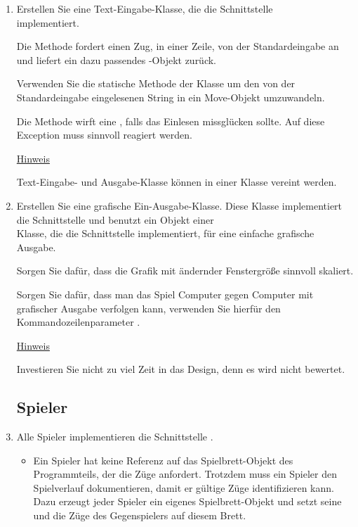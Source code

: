 \begin{enumerate}
\item Erstellen Sie eine Text-Eingabe-Klasse, die die Schnittstelle \\  implementiert.

Die Methode  fordert einen Zug, in einer Zeile, von der Standardeingabe an und liefert ein dazu passendes -Objekt zurück.

Verwenden Sie die statische Methode  der Klasse  um den von der Standardeingabe eingelesenen String in ein Move-Objekt umzuwandeln.

Die Methode  wirft eine , falls das Einlesen missglücken sollte. Auf diese Exception muss sinnvoll reagiert werden.

\underline{Hinweis}

Text-Eingabe- und Ausgabe-Klasse können in einer Klasse vereint werden.

\item Erstellen Sie eine grafische Ein-Ausgabe-Klasse. Diese Klasse implementiert die Schnittstelle  und benutzt ein Objekt einer \\Klasse, die die Schnittstelle  implementiert, für eine einfache grafische Ausgabe.

Sorgen Sie dafür, dass die Grafik mit ändernder Fenstergröße sinnvoll skaliert.

Sorgen Sie dafür, dass man das Spiel Computer gegen Computer mit grafischer Ausgabe verfolgen kann, verwenden Sie hierfür den Kommandozeilenparameter .

\underline{Hinweis}

Investieren Sie nicht zu viel Zeit in das Design, denn es wird nicht bewertet.

\subsection*{Spieler}

\item Alle Spieler implementieren die Schnittstelle .

\begin{itemize}
\item Ein Spieler hat keine Referenz auf das Spielbrett-Objekt des Programmteils, der die Züge anfordert. Trotzdem muss ein Spieler den Spielverlauf dokumentieren, damit er gültige Züge identifizieren kann. Dazu erzeugt jeder Spieler ein eigenes Spielbrett-Objekt und setzt seine und die Züge des Gegenspielers auf diesem Brett.


\end{itemize}
\end{enumerate}
